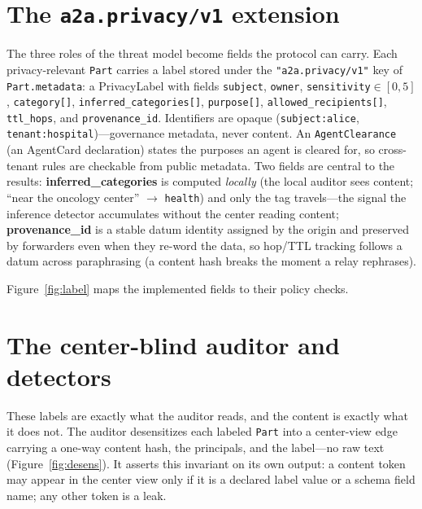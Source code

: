 \documentclass[conference,compsoc]{IEEEtran}
\newcommand{\ext}{\texttt{a2a.privacy/v1}}
\begin{document}
\section{The \ext{} extension}\label{sec:ext}
The three roles of the threat model become fields the protocol can carry. Each
privacy-relevant \texttt{Part} carries a label stored under the
\texttt{"a2a.privacy/v1"} key of \texttt{Part.metadata}: a \textsf{PrivacyLabel}
with fields \texttt{subject}, \texttt{owner}, \texttt{sensitivity}${\in}[0,5]$,
\texttt{category[]}, \texttt{inferred\_categories[]}, \texttt{purpose[]},
\texttt{allowed\_recipients[]}, \texttt{ttl\_hops}, and \texttt{provenance\_id}.
Identifiers are opaque (\texttt{subject:alice}, \texttt{tenant:hospital})---governance
metadata, never content. An \texttt{AgentClearance} (an AgentCard declaration)
states the purposes an agent is cleared for, so cross-tenant rules are checkable
from public metadata. Two fields are central to the results:
\textbf{inferred\_categories} is computed \emph{locally} (the local auditor sees
content; ``near the oncology center'' $\rightarrow$ \texttt{health}) and only the
tag travels---the signal the inference detector accumulates without the center
reading content; \textbf{provenance\_id} is a stable datum identity assigned by the
origin and preserved by forwarders even when they re-word the data, so hop/TTL
tracking follows a datum across paraphrasing (a content hash breaks the moment a
relay rephrases).

Figure~\ref{fig:label} maps the implemented fields to their policy checks.


\section{The center-blind auditor and detectors}\label{sec:auditor}
These labels are exactly what the auditor reads, and the content is exactly what
it does not. The auditor desensitizes each labeled \texttt{Part} into a
center-view edge carrying a one-way content hash, the principals, and the
label---no raw text (Figure~\ref{fig:desens}). It
asserts this invariant on its own output: a content token may appear in the center
view only if it is a declared label value or a schema field name; any other token
is a leak.
\end{document}

